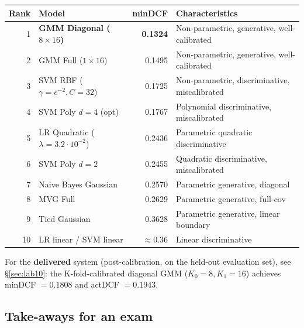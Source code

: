 \documentclass[11pt,a4paper]{article}
\begin{document}
\begin{table}[H]
\centering
\small
\begin{tabular}{rlrl}
\toprule
Rank & Model                                  & minDCF             & Characteristics \\
\midrule
1    & \textbf{GMM Diagonal ($8\times 16$)}    & \textbf{0.1324}    & Non-parametric, generative, well-calibrated \\
2    & GMM Full ($1\times 16$)                 & 0.1495             & Non-parametric, generative, well-calibrated \\
3    & SVM RBF ($\gamma=e^{-2}, C=32$)         & 0.1725             & Non-parametric, discriminative, miscalibrated \\
4    & SVM Poly $d=4$ (opt)                    & 0.1767             & Polynomial discriminative, miscalibrated \\
5    & LR Quadratic ($\lambda=3.2\cdot 10^{-2}$)& 0.2436            & Parametric quadratic discriminative \\
6    & SVM Poly $d=2$                          & 0.2455             & Quadratic discriminative, miscalibrated \\
7    & Naive Bayes Gaussian                    & 0.2570             & Parametric generative, diagonal \\
8    & MVG Full                                & 0.2629             & Parametric generative, full-cov \\
9    & Tied Gaussian                           & 0.3628             & Parametric generative, linear boundary \\
10   & LR linear / SVM linear                  & $\approx 0.36$     & Linear discriminative \\
\bottomrule
\end{tabular}
\end{table}

For the \textbf{delivered} system (post-calibration, on the held-out
evaluation set), see \S\ref{sec:lab10}: the K-fold-calibrated diagonal
GMM ($K_0=8, K_1=16$) achieves minDCF $=0.1808$ and actDCF $=0.1943$.

\subsection{Take-aways for an exam}
\end{document}
